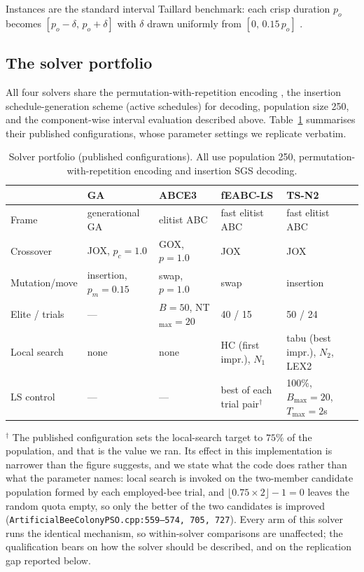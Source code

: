 \documentclass[review]{elsarticle}
\begin{document}
Instances are the standard interval Taillard benchmark: each crisp duration
$p_o$ becomes $[p_o-\delta,\,p_o+\delta]$ with $\delta$ drawn uniformly
from $[0,\,0.15\,p_o]$ \cite{DiazIPMU2020,taillard1993benchmarks}.

\subsection{The solver portfolio}
All four solvers share the permutation-with-repetition encoding
\cite{Bierwirth1995}, the insertion schedule-generation scheme (active
schedules) for decoding, population size 250, and the component-wise
interval evaluation described above. Table~\ref{tab:portfolio} summarises
their published configurations, whose parameter settings we replicate
verbatim.

\begin{table}[htbp]
\centering\small
\caption{Solver portfolio (published configurations). All use population
250, permutation-with-repetition encoding and insertion SGS decoding.}
\label{tab:portfolio}
\setlength{\tabcolsep}{4pt}\footnotesize
\begin{tabular}{@{}lp{1.9cm}p{2.1cm}p{2.2cm}p{3.0cm}@{}}
\toprule
 & GA \cite{DiazIPMU2020} & ABCE3 \cite{DiazIWINAC2022} &
 fEABC-LS \cite{DiazNatComp2023} & TS-N2 \cite{DiazTSN2}\\
\midrule
Frame & generational GA & elitist ABC & fast elitist ABC & fast elitist ABC\\
Crossover & JOX, $p_c{=}1.0$ & GOX, $p{=}1.0$ & JOX & JOX\\
Mutation/move & insertion, $p_m{=}0.15$ & swap, $p{=}1.0$ & swap & insertion\\
Elite / trials & --- & $B{=}50$, NT$_{\max}{=}20$ & 40 / 15 & 50 / 24\\
Local search & none & none & HC (first impr.), $N_1$ & tabu (best impr.), $N_2$, LEX2\\
LS control & --- & --- & best of each trial pair$^{\dagger}$ & 100\%, $B_{\max}{=}20$, $T_{\max}{=}2$s\\
\bottomrule
\end{tabular}

\vspace{2pt}
\footnotesize
$^{\dagger}$ The published configuration sets the local-search target to
$75\%$ of the population, and that is the value we ran. Its effect in this
implementation is narrower than the figure suggests, and we state what the
code does rather than what the parameter names: local search is invoked on
the two-member candidate population formed by each employed-bee trial, and
$\lfloor 0.75\times 2\rfloor-1=0$ leaves the random quota empty, so only the
better of the two candidates is improved
(\texttt{ArtificialBeeColonyPSO.cpp:559--574,\,705,\,727}). Every arm of
this solver runs the identical mechanism, so within-solver comparisons are
unaffected; the qualification bears on how the solver should be described,
and on the replication gap reported below.
\normalsize
\end{table}
\end{document}
